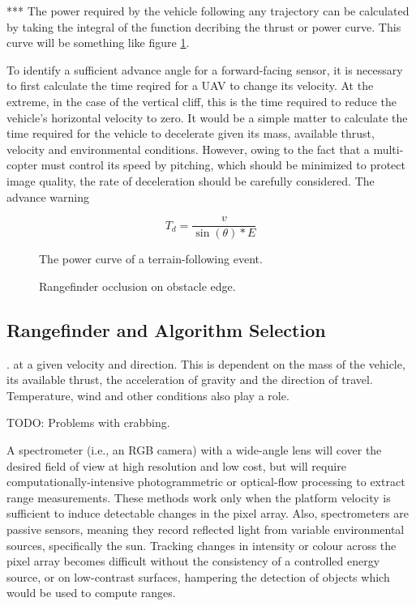 \documentclass[10pt,a4paper]{report}
\begin{document}
*** The power required by the vehicle following any trajectory can be calculated by taking the integral of the function decribing the thrust or power curve. This curve will be something like figure \ref{fig:uav_power_curve}.

To identify a sufficient advance angle for a forward-facing sensor, it is necessary to first calculate the time reqired for a UAV to change its velocity. At the extreme, in the case of the vertical cliff, this is the time required to reduce the vehicle's horizontal velocity to zero. It would be a simple matter to calculate the time required for the vehicle to decelerate given its mass, available thrust, velocity and environmental conditions. However, owing to the fact that a multi-copter must control its speed by pitching, which should be minimized to protect image quality, the rate of deceleration should be carefully considered. The advance warning

\begin{equation}
T_d = \dfrac{v}{\sin(\theta) * E}
\label{eq:decel}
\end{equation} 

\begin{figure}
\centering
\def\svgscale{0.8}

\caption{The power curve of a terrain-following event.}
\label{fig:uav_power_curve}
\end{figure}


\begin{figure}
\centering
\def\svgscale{0.8}

\caption{Rangefinder occlusion on obstacle edge.}
\label{fig:uav_edge_occlude}
\end{figure}

\subsection{Rangefinder and Algorithm Selection}


.  at a given velocity and direction. This is dependent on the mass of the vehicle, its available thrust, the acceleration of gravity and the direction of travel. Temperature, wind and other conditions also play a role. 

TODO: Problems with crabbing.

A spectrometer (i.e., an RGB camera) with a wide-angle lens will cover the desired field of view at high resolution and low cost, but will require computationally-intensive photogrammetric or optical-flow processing to extract range measurements. These methods work only when the platform velocity is sufficient to induce detectable changes in the pixel array. Also, spectrometers are passive sensors, meaning they record reflected light from variable environmental sources, specifically the sun. Tracking changes in intensity or colour across the pixel array becomes difficult without the consistency of a controlled energy source, or on low-contrast surfaces, hampering the detection of objects which would be used to compute ranges.
\end{document}
